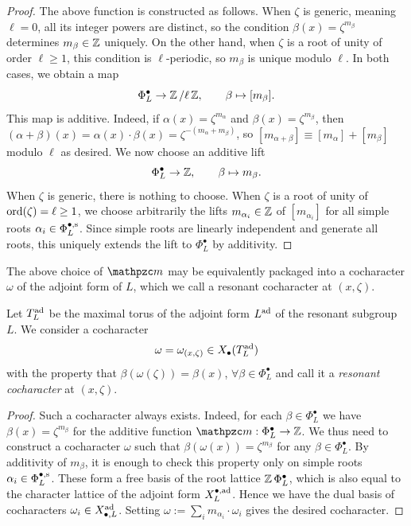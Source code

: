 \begin{proof}
The above function is constructed as follows. 
When $\zeta$ is generic, meaning $\ell=0$, all its integer powers are distinct, so the condition $\beta(x) = \zeta^{m_{\beta}}$ determines $m_{\beta} \in \operatorname{\mathbb{Z}}$ uniquely. On the other hand, when $\zeta$ is a root of unity of order $\ell \geq 1$, this condition is $\ell$-periodic, so $m_{\beta}$ is unique modulo $\ell$. In both cases, we obtain a map
\begin{equation*}
    \Phi^{\bullet}_L \to \operatorname{\mathbb{Z}} / \ell \operatorname{\mathbb{Z}}, \qquad \beta \mapsto [m_{\beta}].
\end{equation*}
This map is additive. 
Indeed, if $\alpha(x) = \zeta^{m_{\alpha}}$ and $\beta(x) = \zeta^{m_{\beta}}$, then $(\alpha + \beta)(x) = \alpha(x)\cdot \beta(x) = \zeta^{-(m_{\alpha}+m_{\beta})}$, so $[m_{\alpha + \beta}] \equiv [m_{\alpha}] + [m_{\beta}]$ modulo $\ell$ as desired.
We now choose an additive lift
\begin{equation*}
   \Phi^{\bullet}_L \to \operatorname{\mathbb{Z}}, \qquad \beta \mapsto m_{\beta}. 
\end{equation*}
When $\zeta$ is generic, there is nothing to choose. When $\zeta$ is a root of unity of $\mathrm{ord}(\zeta) = \ell \geq 1$, we choose arbitrarily the lifts $m_{\alpha_i} \in \operatorname{\mathbb{Z}}$ of $[m_{\alpha_i}]$ for all simple roots $\alpha_i \in \Phi^{\bullet, \mathrm{s}}_L$.
Since simple roots are linearly independent and generate all roots, this uniquely extends the lift to $\Phi^{\bullet}_L$ by additivity.
\end{proof}


The above choice of $\mm$ may be equivalently packaged into a cocharacter $\omega$ of the adjoint form of $L$, which we call a resonant cocharacter at $(x, \zeta)$.
\begin{construction}
Let $T^{\operatorname{ad}}_L$ be the maximal torus of the adjoint form $L^{\operatorname{ad}}$ of the resonant subgroup $L$.
We consider a cocharacter
\begin{equation*}
 \omega = \omega_{(x, \zeta)} \in X_{\bullet}(T^{\operatorname{ad}}_L)   
\end{equation*}
with the property that $\beta(\omega(\zeta)) = \beta(x)$, $\forall \beta \in \Phi^{\bullet}_L$ and call it a \emph{resonant cocharacter} at $(x, \zeta)$.
\end{construction}
\begin{proof}
Such a cocharacter always exists. Indeed, for each $\beta \in \Phi^{\bullet}_L$ we have $\beta(x) = \zeta^{m_{\beta}}$ for the additive function $\mm: \Phi^{\bullet}_L \to \Z$. We thus need to construct a cocharacter $\omega$ such that $\beta(\omega(x)) = \zeta^{m_{\beta}}$ for any $\beta \in \Phi^{\bullet}_L$. By additivity of $m_{\beta}$, it is enough to check this property only on simple roots $\alpha_i \in \Phi^{\bullet, \mathrm{s}}_L$. These form a free basis of the root lattice $\operatorname{\mathbb{Z}}\Phi^{\bullet}_L$, which is also equal to the character lattice of the adjoint form $X^{\bullet, \operatorname{ad}}_{L}$. Hence we have the dual basis of cocharacters $\omega_i \in X^{{\operatorname{ad}}}_{\bullet, L}$. Setting $\omega := \sum_i m_{\alpha_i} \cdot \omega_i$ gives the desired cocharacter.
\end{proof}






